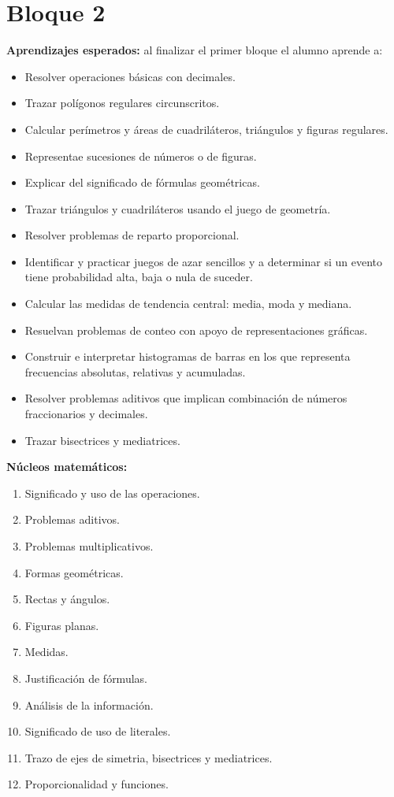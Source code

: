 \documentclass[11pt]{article}
\begin{document}
\section*{Bloque 2}

\textbf{Aprendizajes esperados:} al finalizar el primer bloque el alumno aprende a:

\begin{itemize}
\setlength\itemsep{-0.4em}
    \item Resolver operaciones b\'asicas con decimales.
    \item Trazar pol\'igonos regulares circunscritos.
    \item Calcular per\'imetros y \'areas de cuadril\'ateros, tri\'angulos y figuras
    regulares.
    \item Representae sucesiones de n\'umeros o de figuras.
    \item Explicar del significado de f\'ormulas geom\'etricas.
    \item Trazar tri\'angulos y cuadril\'ateros usando el juego de geometr\'ia.
    \item Resolver problemas de reparto proporcional.
    \item Identificar y practicar juegos de azar sencillos y a determinar si un 
    evento tiene probabilidad alta, baja o nula de suceder.
    \item Calcular las medidas de tendencia central: media, moda y mediana.
    \item Resuelvan problemas de conteo con apoyo de representaciones gr\'aficas.
    \item Construir e interpretar histogramas de barras en los que representa
    frecuencias absolutas, relativas y acumuladas.
    \item Resolver problemas aditivos que implican combinaci\'on de n\'umeros
    fraccionarios y decimales.
    \item Trazar bisectrices y mediatrices.
\end{itemize}


\textbf{N\'ucleos matem\'aticos:}
\begin{enumerate}
\setlength\itemsep{-0.4em}
    \item Significado y uso de las operaciones.
    \item Problemas aditivos.
    \item Problemas multiplicativos.
    \item Formas geom\'etricas.
    \item Rectas y \'angulos.
    \item Figuras planas.
    \item Medidas.
    \item Justificaci\'on de f\'ormulas.
    \item An\'alisis de la informaci\'on.
    \item Significado de uso de literales.
    \item Trazo de ejes de simetria, bisectrices y mediatrices.
    \item Proporcionalidad y funciones.
\end{enumerate}
\end{document}
